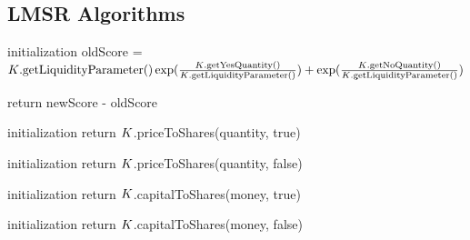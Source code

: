\subsection{LMSR Algorithms}
\begin{algorithm}[H]
\SetAlgoLined
{}
initialization\;
oldScore = $K\text{.getLiquidityParameter()}\exp(\frac{K\text{.getYesQuantity()}}{K\text{.getLiquidityParameter()}}) + \exp(\frac{K\text{.getNoQuantity()}}{K\text{.getLiquidityParameter()}})$\;

return newScore - oldScore\;
\end{algorithm}

\begin{algorithm}[H]
\SetAlgoLined
{}
initialization\;
return $K$.priceToShares(quantity, true)\;
\end{algorithm}

\begin{algorithm}[H]
\SetAlgoLined
{}
initialization\;
return $K$.priceToShares(quantity, false)\;
\end{algorithm}

\begin{algorithm}[H]
\SetAlgoLined
{}
initialization\;
return $K$.capitalToShares(money, true)\;
\end{algorithm}

\begin{algorithm}[H]
\SetAlgoLined
{}
initialization\;
return $K$.capitalToShares(money, false)\;
\end{algorithm}

